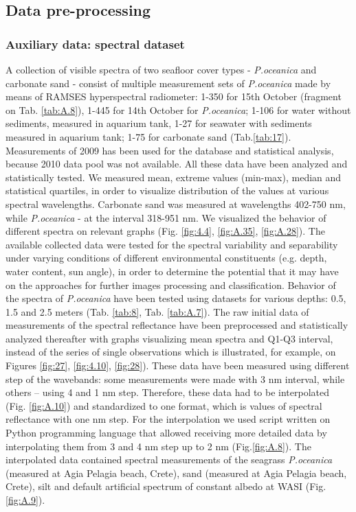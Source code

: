 \documentclass[11pt]{article}
\begin{document}
\subsection{Data pre-processing}

\subsubsection{Auxiliary data: spectral dataset}
A collection of visible spectra of two seafloor cover types - \textit{P.oceanica} and carbonate sand - consist of multiple measurement sets of \textit{P.oceanica} made by means of RAMSES hyperspectral radiometer: 1-350 for 15th October (fragment on Tab. \ref{tab:A.8}), 1-445 for 14th October for \textit{P.oceanica}; 1-106 for water without sediments, measured in aquarium tank, 1-27 for seawater with sediments measured in aquarium tank; 1-75 for carbonate sand (Tab.\ref{tab:17}). Measurements of 2009 has been used for the database and statistical analysis, because 2010 data pool was not available. All these data have been analyzed and statistically tested. We measured mean, extreme values (min-max), median and statistical quartiles, in order to visualize distribution of the values at various spectral wavelengths. Carbonate sand was measured at wavelengths 402-750 nm, while \textit{P.oceanica} - at the interval 318-951 nm. We visualized the behavior of different spectra on relevant graphs (Fig. \ref{fig:4.4}, \ref{fig:A.35}, \ref{fig:A.28}).\label{page-28}
The available collected data were tested for the spectral variability and separability under varying conditions of different environmental
constituents (e.g. depth, water content, sun angle), in order to determine the
potential that it may have on the approaches for further images processing and classification. Behavior of the spectra of \textit{P.oceanica} have been tested using datasets for various depths: 0.5, 1.5 and 2.5 meters (Tab. \ref{tab:8}, Tab. \ref{tab:A.7}). The raw
initial data of measurements of the spectral reflectance have been preprocessed and statistically analyzed thereafter with graphs visualizing mean spectra and Q1-Q3 interval, instead of the series of single observations which is illustrated, for example, on Figures \ref{fig:27}, \ref{fig:4.10}, \ref{fig:28}). These data have been measured using different step of the wavebands: some measurements
were made with 3 nm interval, while others – using 4 and 1 nm step.
Therefore, these data had to be interpolated (Fig. \ref{fig:A.10}) and standardized to one
format, which is values of spectral reflectance with one nm step. For the
interpolation we used script written on Python programming language that allowed receiving more 
detailed data by interpolating them from 3 and 4 nm step up to 2 nm (Fig.\ref{fig:A.8}).
The interpolated data contained spectral measurements of the seagrass 	\textit{P.oceanica} (measured at Agia
Pelagia beach, Crete), sand (measured at Agia Pelagia beach, Crete), silt and default artificial
spectrum of constant albedo at \ac{WASI} (Fig.\ref{fig:A.9}). 
\end{document}
